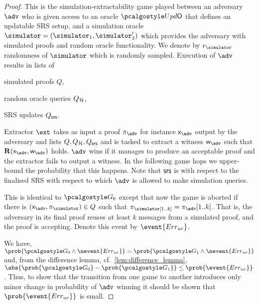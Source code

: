 \begin{proof}		

   This is the simulation-extractability game played between an adversary
  $\advse$ who is given access to an oracle $\initU$ that defines an updatable SRS
  setup, and a simulation oracle $\simulator = (\simulator_1, \simulator_2')$ which provides the adversary with simulated
  proofs and random oracle functionality. We denote by $\rsim$
  randomness of $\simulator$ which is randomly sampled. Execution of $\advse$ results in
  lists of
  \begin{inparaenum}[(1)]
  \item simulated proofs $Q$,
  \item random oracle queries $Q_{\mathcal{H}}$,
  \item SRS updates $Q_{\mathsf{srs}}$.
  \end{inparaenum}
%
  Extractor $\ext$ takes as input a proof $\zkproof_{\advse}$ for instance
  $\inp_{\advse}$ output by the adversary and lists $Q, Q_{\mathcal{H}}, Q_{\mathsf{srs}}$ and is tasked
  to extract a witness $\wit_{\advse}$ such that $\REL(\inp_{\advse}, \wit_{\advse})$
  holds. $\advse$ wins if it manages to produce an acceptable proof and the extractor
  fails to output a witness. In the following game hops we upper-bound the
  probability that this happens. Note that $\mathsf{srs}$ is with respect to the finalised
  SRS with respect to which $\adv$ is allowed to make simulation queries.

   This is identical to $\game{0}$ except that now the game is aborted if
  there is $(\inp_\advse, \zkproof_{\simulator}) \in Q$ such that
  $\zkproof_\simulator[1..k] = \zkproof_{\advse}[1..k]$. That is, the adversary in
  its final proof reuses at least $k$ messages from a simulated proof, and the proof
  is accepting.  Denote this event by $\event{\errur}$.

   We have,
  \( \prob{\game{0} \land \nevent{\errur}} = \prob{\game{1} \land \nevent{\errur}} \)
  and, from the difference lemma, cf.~\cref{lem:difference_lemma},
  $ \abs{\prob{\game{0}} - \prob{\game{1}}} \leq \prob{\event{\errur}}\,$.  Thus, to
  show that the transition from one game to another introduces only minor change in
  probability of $\adv$ winning it should be shown that $\prob{\event{\errur}}$ is
  small.
  

\end{proof}
